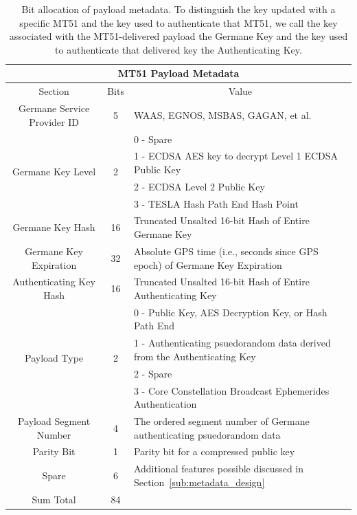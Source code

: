 \documentclass[APA,STIX1COL]{IONjournal/ION-APA Template}
\begin{document}
		\begin{table}%
			\center
			\begin{tabular}{|c|c|l|} \hline
				\multicolumn{3}{|c|}{MT51 Payload Metadata} \\ \hline
				Section & Bits & \multicolumn{1}{|c|}{Value} \\ \hline
				Germane Service Provider ID & 5 & WAAS, EGNOS, MSBAS, GAGAN, et al. \\ \hline
				\multirow{4}{*}{Germane Key Level} & \multirow{4}{*}{2} & 0 - Spare \\ 
				& & 1 - ECDSA AES key to decrypt Level 1 ECDSA Public Key \\
				& & 2 - ECDSA Level 2 Public Key \\
				& & 3 - TESLA Hash Path End Hash Point \\ \hline
				Germane Key Hash & 16 & Truncated Unsalted 16-bit Hash of Entire Germane Key \\ \hline
				Germane Key Expiration & 32 & Absolute GPS time (i.e., seconds since GPS epoch) of Germane Key Expiration \\ \hline
				Authenticating Key Hash & 16 & Truncated Unsalted 16-bit Hash of Entire Authenticating Key \\ \hline
				\multirow{4}{*}{Payload Type} & \multirow{4}{*}{2} & 0 - Public Key, AES Decryption Key, or Hash Path End \\
				& & 1 - Authenticating psuedorandom data derived from the Authenticating Key \\ 
				& & 2 - Spare \\ 
				& & 3 - Core Constellation Broadcast Ephemerides Authentication \\ \hline
				Payload Segment Number & 4 & The ordered segment number of Germane authenticating psuedorandom data \\ \hline
				Parity Bit & 1 & Parity bit for a compressed public key \\ \hline
				Spare & 6 & Additional features possible discussed in Section~\ref{sub:metadata_design} \\ \hline
				Sum Total & 84 & \\ \hline
			\end{tabular}
			\caption{Bit allocation of payload metadata. To distinguish the key updated with a specific MT51 and the key used to authenticate that MT51, we call the key associated with the MT51-delivered payload the Germane Key and the key used to authenticate that delivered key the Authenticating Key.}
			\label{tab: meta-data}
		\end{table}
		
\end{document}
